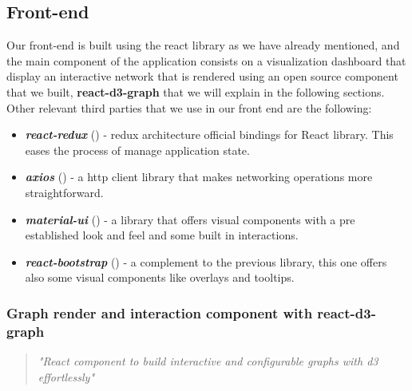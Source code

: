 \subsection{Front-end}

Our front-end is built using the react library as we have already mentioned, and the main component of the application consists on a visualization dashboard that display an interactive network that is rendered using an open source component that we built, \textbf{react-d3-graph} \cite{reactd3graph} that we will explain in the following sections. Other relevant third parties that we use in our front end are the following:

\begin{itemize}
    \item \textit{\textbf{react-redux}} (\cite{reactredux}) - redux architecture official bindings for React library. This eases the process of manage application state.
    \item \textit{\textbf{axios}} (\cite{axios}) - a http client library that makes networking operations more straightforward.
    \item \textit{\textbf{material-ui}} (\cite{materialui}) - a library that offers visual components with a pre established look and feel and some built in interactions.
    \item \textit{\textbf{react-bootstrap}} (\cite{reactbootstrap}) - a complement to the previous library, this one offers also some visual components like overlays and tooltips.
\end{itemize}

\subsubsection{Graph render and interaction component with react-d3-graph}

\begin{quote}
\textit{"React component to build interactive and configurable graphs with d3 effortlessly"}
\end{quote}

